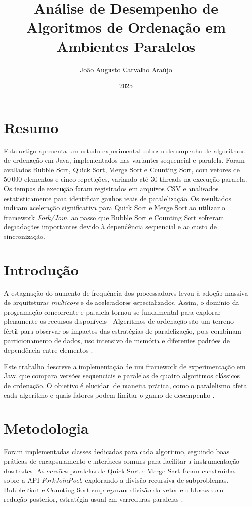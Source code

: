 \documentclass[11pt,twoside,a4paper]{article}
\date{2025}
\title{Análise de Desempenho de Algoritmos de Ordenação em Ambientes Paralelos}
\author[1]{João Augusto Carvalho Araújo}%
\affil[1]{Universidade de Fortaleza - Engenharia da Computação}
\begin{document}
\inserirtitulo
\linespread{1.5}%

\section{Resumo}
\par Este artigo apresenta um estudo experimental sobre o desempenho de algoritmos de ordenação em Java, implementados nas variantes sequencial e paralela. Foram avaliados Bubble Sort, Quick Sort, Merge Sort e Counting Sort, com vetores de 50\,000 elementos e cinco repetições, variando até 30 threads na execução paralela. Os tempos de execução foram registrados em arquivos CSV e analisados estatisticamente para identificar ganhos reais de paralelização. Os resultados indicam aceleração significativa para Quick Sort e Merge Sort ao utilizar o framework \textit{Fork/Join}, ao passo que Bubble Sort e Counting Sort sofreram degradações importantes devido à dependência sequencial e ao custo de sincronização.


\section{Introdução}
\par A estagnação do aumento de frequência dos processadores levou à adoção massiva de arquiteturas \textit{multicore} e de aceleradores especializados. Assim, o domínio da programação concorrente e paralela tornou-se fundamental para explorar plenamente os recursos disponíveis \cite{tanenbaum2015mos,herlihy2020art}. Algoritmos de ordenação são um terreno fértil para observar os impactos das estratégias de paralelização, pois combinam particionamento de dados, uso intensivo de memória e diferentes padrões de dependência entre elementos \cite{cormen2022clrs}.

\par Este trabalho descreve a implementação de um framework de experimentação em Java que compara versões sequenciais e paralelas de quatro algoritmos clássicos de ordenação. O objetivo é elucidar, de maneira prática, como o paralelismo afeta cada algoritmo e quais fatores podem limitar o ganho de desempenho \cite{mccool2012structured}.

\section{Metodologia}
\par Foram implementadas classes dedicadas para cada algoritmo, seguindo boas práticas de encapsulamento e interfaces comuns para facilitar a instrumentação dos testes. As versões paralelas de Quick Sort e Merge Sort foram construídas sobre a API \textit{ForkJoinPool}, explorando a divisão recursiva de subproblemas. Bubble Sort e Counting Sort empregaram divisão do vetor em blocos com redução posterior, estratégia usual em varreduras paralelas \cite{mccool2012structured}.
\end{document}
